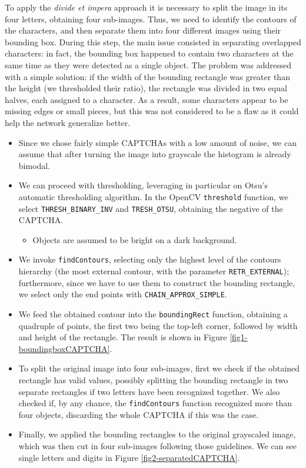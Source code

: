 To apply the \emph{divide et impera} approach it is necessary to split
the image in its four letters, obtaining four sub-images. Thus, we need
to identify the contours of the characters, and then separate them into
four different images using their bounding box. During this step, the
main issue consisted in separating overlapped characters: in fact, the
bounding box happened to contain two characters at the same time as they
were detected as a single object. The problem was addressed with a
simple solution: if the width of the bounding rectangle was greater than
the height (we thresholded their ratio), the rectangle was divided in
two equal halves, each assigned to a character. As a result, some
characters appear to be missing edges or small pieces, but this was not
considered to be a flaw as it could help the network generalize better.
\begin{itemize}
\item Since we chose fairly simple CAPTCHAs with a low amount of noise, we
can assume that after turning the image into grayscale the histogram is
already bimodal. 
\item We can proceed with thresholding, leveraging in
particular on Otsu's automatic thresholding algorithm. In the OpenCV
\texttt{threshold} function, we select \texttt{THRESH\_BINARY\_INV} and
\texttt{TRESH\_OTSU}, obtaining the negative of the CAPTCHA. 
\begin{itemize}
	\item  Objects are assumed to be bright on a dark background.
\end{itemize}
\item We invoke \texttt{findContours},
selecting only the highest level of the contours hierarchy (the most
external contour, with the parameter \texttt{RETR\_EXTERNAL});
furthermore, since we have to use them to construct the bounding
rectangle, we select only the end points with
\texttt{CHAIN\_APPROX\_SIMPLE}. 
\item We feed the obtained contour into the
\texttt{boundingRect} function, obtaining a quadruple of points, the
first two being the top-left corner, followed by width and height of the
rectangle. The result is shown in Figure \ref{fig1-boundingboxCAPTCHA}.
\item To split the original image into four sub-images, first we
check if the obtained rectangle has valid values, possibly splitting the
bounding rectangle in two separate rectangles if two letters have been
recognized together. We also checked if, by any chance, the
\texttt{findContours} function recognized more than four objects,
discarding the whole CAPTCHA if this was the case. 
\item Finally, we applied
the bounding rectangles to the original grayscaled image, which was then
cut in four sub-images following those guidelines. We can see single letters and digits in Figure \ref{fig2-separatedCAPTCHA}.
\end{itemize}

